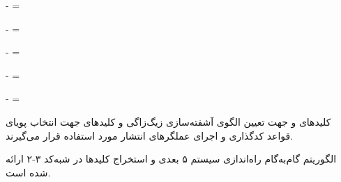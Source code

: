 

{-}  =  \par

{-}  =  \par

{-}  =  \par

{-}  =  \par

{-}  =  \par



کلیدهای  و  جهت تعیین الگوی آشفته‌سازی زیگ‌زاگی و کلیدهای  جهت انتخاب پویای قواعد کدگذاری  و اجرای عملگرهای انتشار  مورد استفاده قرار می‌گیرند. \par



الگوریتم گام‌به‌گام راه‌اندازی سیستم ۵ بعدی و استخراج کلیدها در شبه‌کد ۳{-}۲ ارائه شده است.\par




